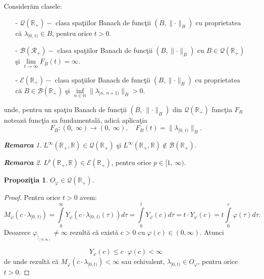 \documentclass[ a4paper, 12pt]{report}
\newtheorem{prop}[theorem]{\bf Propozi\c tia }
\theoremstyle{definition}
\theoremstyle{remark}
\newtheorem{remarc}{\bf Remarca}[section]
\numberwithin{equation}{section}
\begin{document}
\noindent Consider\u am clasele:\\
\begin{itemize}
\item[-] $\mathcal{Q}(\mathbb{R}_+)-$ clasa spa\c tiilor Banach de func\c tii $(B, \lVert \cdot \rVert_B)$ cu proprietatea c\u a $\lambda_{[0,\, t)} \in B$, pentru orice $t > 0$.

\item[-] $\mathcal{B}(\mathcal{R}_+)-$ clasa spa\c tiilor Banach de func\c tii $(B,\lVert \cdot \rVert_B)$ cu $B \in \mathcal{Q}(\mathbb{R_+})$ \c si $\lim\limits_{t \rightarrow \infty} F_B(t) = \infty.$
\item[-] $\mathcal{E}(\mathbb{R}_+)-$ clasa spa\c tiilor Banach de func\c tii $(B, \lVert \cdot \rVert_B)$ cu proprietatea c\u a $B \in \mathcal{B}(\mathbb{R}_+)$ \c si $\inf\limits_{n \in \mathbb
N} \lVert \lambda_ {[n,\, n+1)}\rVert_B > 0.$
\end{itemize}
unde, pentru un spa\c tiu Banach de func\c tii $(B, \, \lVert \cdot \rVert_B)$ din $\mathcal{Q}(\mathbb{R}_+)$ func\c tia $F_B$ noteaz\u a func\c tia sa fundamental\u a, adic\u a aplica\c tia
$$F_B : (0, \; \infty) \to (0, \; \infty), \quad F_B(t) = \lVert \lambda_{[0, \, t)} \rVert_B.$$

\begin{remarc}
$L^\infty(\mathbb{R}_+,\mathbb{R}) \in \mathcal{Q}(\mathbb{R}_+)$ \c si $L^\infty(\mathbb{R}_+,\mathbb{R}) \notin \mathcal{B}(\mathbb{R}_+).$
\end{remarc}

\begin{remarc}
$L^p(\mathbb{R}_+,\mathbb{R}) \in \mathcal{E}(\mathbb{R}_+)$, pentru orice $p \in [1,\, \infty).$
\end{remarc}

\begin{prop}
$O_\varphi \in \mathcal{Q}(\mathbb{R}_+).$
\end{prop}

\begin{proof} Pentru orice $t > 0$ avem:
$$M_\varphi(c \cdot \lambda_{[0,\, t)}) = \int\limits_{0}^{\infty}Y_\varphi(c \cdot \lambda_{[0,\, t)}(\tau)) d\tau = \int\limits_{0}^{t} Y_\varphi(c) d\tau = t \cdot Y_\varphi (c) = t\int\limits_{0}^{c}\varphi(\tau)d \tau.$$
Deoarece $\varphi_{|_{(0,\infty)}} \not= \infty$ rezult\u a c\u a  exist\u a $c > 0$ cu $\varphi(c) \in (0,\infty)$. Atunci

$$Y_\varphi(c) \leq c \cdot \varphi(c) < \infty$$ de unde rezult\u a c\u a $M_\varphi(c \cdot \lambda_{[0,t)}) < \infty$ sau echivalent, $\lambda_{[0,t)} \in O_\varphi$, pentru orice $t > 0$.
\end{proof}
\end{document}
